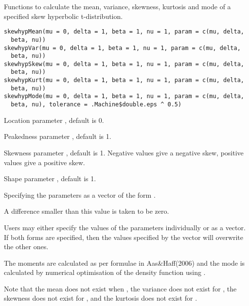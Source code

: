 \begin{Description}\relax
Functions to calculate the mean, variance, skewness, kurtosis and mode
of a specified skew hyperbolic t-distribution.
\end{Description}
\begin{Usage}
\begin{verbatim}
skewhypMean(mu = 0, delta = 1, beta = 1, nu = 1, param = c(mu, delta,
  beta, nu))
skewhypVar(mu = 0, delta = 1, beta = 1, nu = 1, param = c(mu, delta,
  beta, nu))
skewhypSkew(mu = 0, delta = 1, beta = 1, nu = 1, param = c(mu, delta,
  beta, nu))
skewhypKurt(mu = 0, delta = 1, beta = 1, nu = 1, param = c(mu, delta,
  beta, nu))
skewhypMode(mu = 0, delta = 1, beta = 1, nu = 1, param = c(mu, delta,
  beta, nu), tolerance = .Machine$double.eps ^ 0.5)
\end{verbatim}
\end{Usage}
\begin{Arguments}
\begin{ldescription}
\item[\code{mu}] Location parameter \eqn{\mu}{}, default is 0.
\item[\code{delta}] Peakedness parameter \eqn{\sigma}{}, default is 1.
\item[\code{beta}] Skewness parameter \eqn{\beta}{}, default is 1. Negative
values give a negative skew, positive values give a positive skew.
\item[\code{nu}] Shape parameter \eqn{\nu}{}, default is 1.
\item[\code{param}] Specifying the parameters as a vector of the form
.
\item[\code{tolerance}] A difference smaller than this value is taken to be zero.
\end{ldescription}
\end{Arguments}
\begin{Details}\relax
Users may either specify the values of the parameters individually or
as a vector. If both forms are specified, then the values specified by
the vector  will overwrite the other ones.

The moments are calculated as per formulae in Aas\&Haff(2006) and the
mode is calculated by numerical optimisation of the density function
using .

Note that the mean does not exist when , the
variance does not exist for , the skewness does
not exist for , and the kurtosis does not exist
for .
\end{Details}

